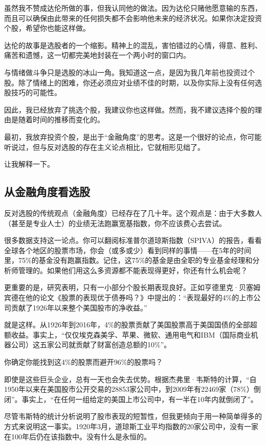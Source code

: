 虽然我不赞成达伦所做的事，但我认同他的做法。因为达伦只赌他愿意输的东西，而且可以确保由此带来的任何损失都不会影响他未来的经济状况。如果你决定投资个股，希望你也能这样做。

达伦的故事是选股者的一个缩影。精神上的混乱，害怕错过的心情，得意、胜利、痛苦和遗憾，这一切都完美地封装在一个两小时的窗口内。

与情绪做斗争只是选股的冰山一角。我知道这一点，是因为我几年前也投资过个股。除了情绪上的困难，你还必须应对业绩不佳的时期，以及你实际上没有任何选股技巧的可能性。

因此，我已经放弃了挑选个股，我建议你也这样做。然而，我不建议选择个股的理由是随着时间的推移而变化的。

最初，我放弃投资个股，是出于“金融角度”的思考。这是一个很好的论点，你可能听说过，但与反对选股的存在主义论点相比，它就相形见绌了。

让我解释一下。

\subsection{从金融角度看选股}
反对选股的传统观点（金融角度）已经存在了几十年。这个观点是：由于大多数人（甚至是专业人士）的业绩无法跑赢宽基指数，你不应该费心去尝试。

很多数据支持这一论点。你可以翻阅标准普尔道琼斯指数（SPIVA）的报告，看看全球各个地区的股票市场，你会（或多或少）看到同样的事情——在5年的时间里，75\%的基金没有跑赢指数。记住，这75\%的基金是由全职的专业基金经理和分析师管理的。如果他们用这么多资源都不能表现得更好，你还有什么机会呢？

更重要的是，研究表明，只有一小部分个股长期表现良好。正如亨德里克·贝塞姆宾德在他的论文《股票的表现优于债券吗？》中提出的：“表现最好的4\%的上市公司贡献了1926年以来整个美国股市的净收益。”

就是这样。从1926年到2016年，4\%的股票贡献了美国股票高于美国国债的全部超额收益。事实上，“仅仅埃克森美孚、苹果、微软、通用电气和IBM（国际商业机器公司）这五家公司就贡献了财富创造总额的10\%”。

你确定你能找到这4\%的股票而避开96\%的股票吗？

即使是这些巨头企业，总有一天也会失去优势。根据杰弗里·韦斯特的计算，“自1950年以来在美国股市公开交易的28853家公司中，到2009年有22469家（78\%）倒闭”。事实上，“在任何一组给定的美国上市公司中，有一半在10年内就倒闭了”。

尽管韦斯特的统计分析说明了股市表现的短暂性，但我更倾向于用一种简单得多的方式来说明这一事实。1920年3月，道琼斯工业平均指数的20家公司中，没有一家在100年后仍在该指数中。没有什么是永恒的。

